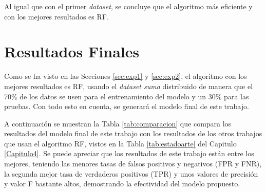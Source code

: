 Al igual que con el primer \textit{dataset}, se concluye que el algoritmo más eficiente y con los mejores resultados es \gls{RF}.

\section{Resultados Finales} \label{sec:resultados}



\noindent Como se ha visto en las Secciones \ref{sec:exp1} y \ref{sec:exp2}, el algoritmo con los mejores resultados es \gls{RF}, usando el \textit{dataset suma} distribuido de manera que el 70\% de los datos se usen para el entrenamiento del modelo y un 30\% para las pruebas. Con todo esto en cuenta, se generará el modelo final de este trabajo.

A continuación se muestran la Tabla \ref{tab:comparacion} que compara los resultados del modelo final de este trabajo con los resultados de los otros trabajos que usan el algoritmo \gls{RF}, vistos en la Tabla \ref{tab:estadoarte} del Capitulo \ref{Capitulo4}. Se puede apreciar que los resultados de este trabajo están entre los mejores, teniendo las menores tasas de falsos positivos y negativos (\gls{FPR} y \gls{FNR}), la segunda mejor tasa de verdaderos positivos (\gls{TPR}) y unos valores de precisión y valor F bastante altos, demostrando la efectividad del modelo propuesto.

